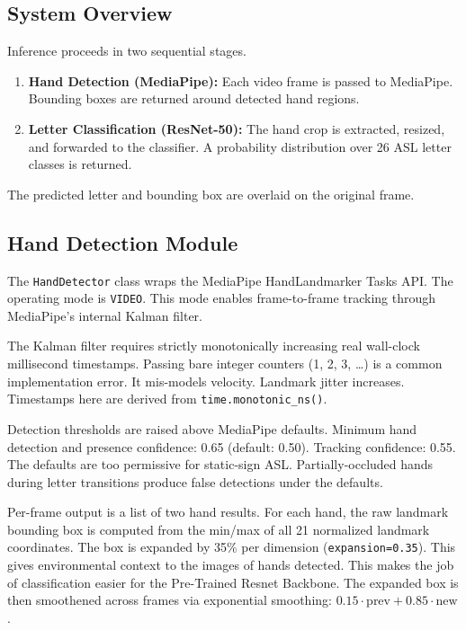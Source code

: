 \subsection{System Overview}

Inference proceeds in two sequential stages.

\begin{enumerate}
    \item \textbf{Hand Detection (MediaPipe):} Each video frame is passed to MediaPipe. Bounding boxes are returned around detected hand regions.
    \item \textbf{Letter Classification (ResNet-50):} The hand crop is extracted, resized, and forwarded to the classifier. A probability distribution over 26 ASL letter classes is returned.
\end{enumerate}

The predicted letter and bounding box are overlaid on the original frame.

\subsection{Hand Detection Module}

The \texttt{HandDetector} class wraps the MediaPipe HandLandmarker Tasks API. The operating mode is \texttt{VIDEO}. This mode enables frame-to-frame tracking through MediaPipe's internal Kalman filter.

The Kalman filter requires strictly monotonically increasing real wall-clock millisecond timestamps. Passing bare integer counters (1, 2, 3, \ldots) is a common implementation error. It mis-models velocity. Landmark jitter increases. Timestamps here are derived from \texttt{time.monotonic\_ns()}.

Detection thresholds are raised above MediaPipe defaults. Minimum hand detection and presence confidence: 0.65 (default: 0.50). Tracking confidence: 0.55. The defaults are too permissive for static-sign ASL. Partially-occluded hands during letter transitions produce false detections under the defaults.

Per-frame output is a list of two hand results. For each hand, 
the raw landmark bounding box is computed from the min/max of all 21 normalized landmark coordinates. 
The box is expanded by 35\% per dimension (\texttt{expansion=0.35}). 
This gives environmental context to the images of hands detected. 
This makes the job of classification easier for the Pre-Trained Resnet Backbone.
The expanded box is then smoothened across frames via exponential 
smoothing: $0.15 \cdot \text{prev} + 0.85 \cdot \text{new}$.

